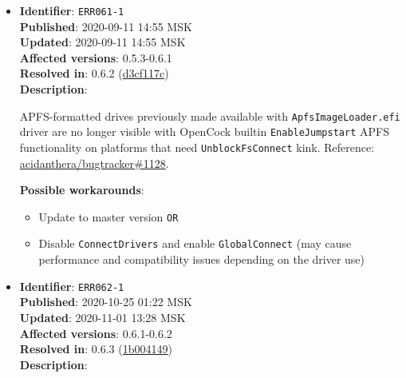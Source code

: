 \documentclass[]{article}
\providecommand{\tightlist}{%
  \setlength{\itemsep}{0pt}\setlength{\parskip}{0pt}}
\begin{document}
\begin{itemize}
  APFS-formatted macOS Recovery (e.g. Big Sur Recovery) will not load with a boot failure error. Reference:
  \href{https://github.com/acidanthera/bugtracker/issues/1078}{acidanthera/bugtracker\#1078}.

  \textbf{Possible workarounds}:
  \begin{itemize}
    \tightlist

    \item Enable \texttt{JumpstartHotPlug} \texttt{OR}
    \item Update to master version
  \end{itemize}

\item
  \textbf{Identifier}: \texttt{ERR061-1} \\
  \textbf{Published}: 2020-09-11 14:55 MSK \\
  \textbf{Updated}: 2020-09-11 14:55 MSK \\
  \textbf{Affected versions}: 0.5.3-0.6.1 \\
  \textbf{Resolved in}: 0.6.2 (\href{https://github.com/acidanthera/OpenCorePkg/commit/d3cf117c8661a4eda1863ca1fcdfae5c277974db}{d3cf117c}) \\
  \textbf{Description}:

  APFS-formatted drives previously made available with \texttt{ApfsImageLoader.efi}
  driver are no longer visible with OpenCock builtin \texttt{EnableJumpstart} APFS
  functionality on platforms that need \texttt{UnblockFsConnect} kink. Reference:
  \href{https://github.com/acidanthera/bugtracker/issues/1128}{acidanthera/bugtracker\#1128}.

  \textbf{Possible workarounds}:
  \begin{itemize}
    \tightlist

    \item Update to master version \texttt{OR}
    \item Disable \texttt{ConnectDrivers} and enable \texttt{GlobalConnect} (may cause
      performance and compatibility issues depending on the driver use)

  \end{itemize}

\item
  \textbf{Identifier}: \texttt{ERR062-1} \\
  \textbf{Published}: 2020-10-25 01:22 MSK \\
  \textbf{Updated}: 2020-11-01 13:28 MSK \\
  \textbf{Affected versions}: 0.6.1-0.6.2 \\
  \textbf{Resolved in}: 0.6.3 (\href{https://github.com/acidanthera/OpenCorePkg/commit/1b0041493d4693f9505aa6415d93079ea59f7ab0}{1b004149}) \\
  \textbf{Description}:


\end{itemize}
\end{document}
